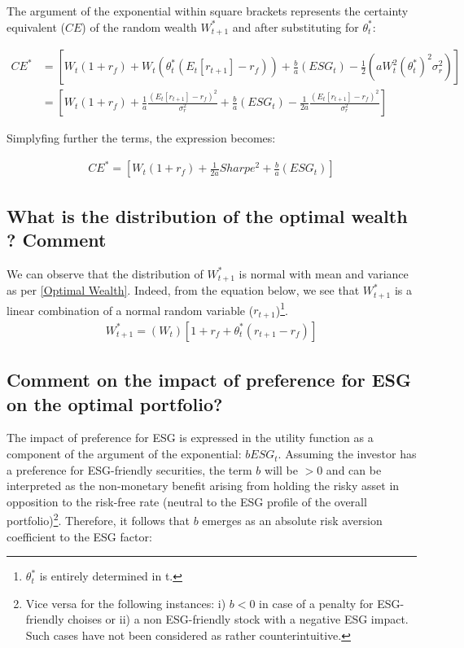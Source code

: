 \documentclass[12pt]{article}
\begin{document}
	The argument of the exponential within square brackets represents the certainty equivalent ($CE$) of the random wealth $W_{t+1}^{*}$ and after substituting for $\theta_t^{*}$: \vspace{-2em}
	
	\begin{align*}
		CE^* &= [W_t(1 + r_f) + W_t(\theta_t^*(E_{t}[r_{t+1}]-r_f)) + \frac{b}{a}(ESG_t) - \frac{1}{2}(aW_t^2(\theta_t^{*})^2\sigma_r^2)] \\
		&= [W_t(1 + r_f) + \frac{1}{a}\frac{(E_{t}[r_{t+1}]-r_f)^2}{\sigma_r^2} + \frac{b}{a}(ESG_t) - \frac{1}{2a}\frac{(E_{t}[r_{t+1}]-r_f)^2}{\sigma_r^2}]
	\end{align*} \vspace{-1.5em}
	
	Simplyfing further the terms, the expression becomes: \vspace{-1.75em}
	
	\begin{align}
		CE^* = [W_t(1 + r_f) + \frac{1}{2a}Sharpe^2 + \frac{b}{a}(ESG_t)] 
	\end{align} \vspace{-2.5em}
	
	\subsection{What is the distribution of the optimal wealth ? Comment}
	We can observe that the distribution of $W_{t+1}^{*}$ is normal with mean and variance as per \ref{Optimal Wealth}. Indeed, from the equation below, we see that $W_{t+1}^{*}$ is a linear combination of a normal random variable ($r_{t+1}$)\footnote {$\theta_t^*$ is entirely determined in t.}.
	\begin{align}
		W_{t+1}^{*} = (W_t) \left[1 + r_f + \theta_t^*(r_{t+1}-r_f) \right]
	\end{align} \vspace{-2.5em}
	
	\subsection{Comment on the impact of preference for ESG on the optimal portfolio?}
	
	The impact of preference for ESG is expressed in the utility function as a component of the argument of the exponential: $bESG_t$. 
	Assuming the investor has a preference for ESG-friendly securities, the term $b$ will be $> 0$ and can be interpreted as the non-monetary benefit arising from holding the risky asset in opposition to the risk-free rate (neutral to the ESG profile of the overall portfolio)\footnote {Vice versa for the following instances: i) $b < 0 $ in case of a penalty for ESG-friendly choises or ii) a non ESG-friendly stock with a negative ESG impact. Such cases have not been considered as rather counterintuitive.}. Therefore, it follows that $b$ emerges as an absolute risk aversion coefficient to the ESG factor:
	
\end{document}
